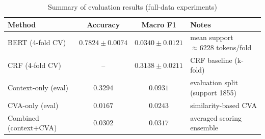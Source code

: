 \begin{table}[ht]
\centering
\caption{Summary of evaluation results (full-data experiments)}
\begin{tabular}{lccp{5cm}}
\toprule
Method & Accuracy & Macro F1 & Notes \\
\midrule
BERT (4-fold CV) & $0.7824\pm0.0074$ & $0.0340\pm0.0121$ & mean support $\approx6228$ tokens/fold \\
CRF (4-fold CV) & -- & $0.3138\pm0.0211$ & CRF baseline (k-fold) \\
Context-only (eval) & $0.3294$ & $0.0931$ & evaluation split (support 1855) \\
CVA-only (eval) & $0.0167$ & $0.0243$ & similarity-based CVA \\
Combined (context+CVA) & $0.0302$ & $0.0317$ & averaged scoring ensemble \\
\bottomrule
\end{tabular}
\label{tab:thesis_results_summary}
\end{table}

